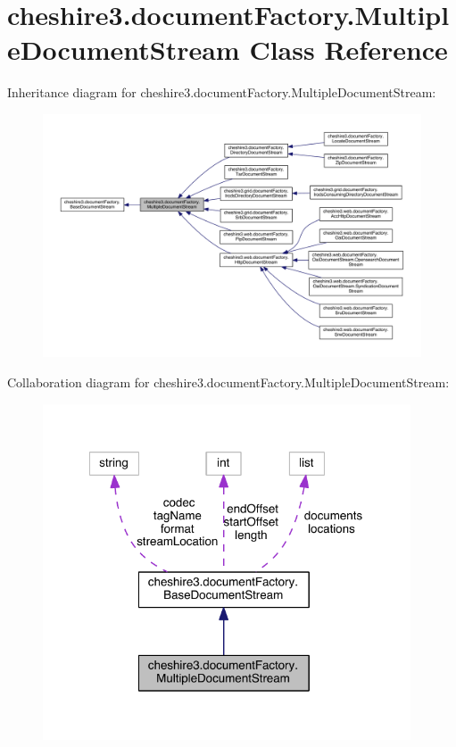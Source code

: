 \hypertarget{classcheshire3_1_1document_factory_1_1_multiple_document_stream}{\section{cheshire3.\-document\-Factory.\-Multiple\-Document\-Stream Class Reference}
\label{classcheshire3_1_1document_factory_1_1_multiple_document_stream}
}


Inheritance diagram for cheshire3.\-document\-Factory.\-Multiple\-Document\-Stream\-:
\nopagebreak
\begin{figure}[H]
\begin{center}
\leavevmode
\includegraphics[width=350pt]{classcheshire3_1_1document_factory_1_1_multiple_document_stream__inherit__graph}
\end{center}
\end{figure}


Collaboration diagram for cheshire3.\-document\-Factory.\-Multiple\-Document\-Stream\-:
\nopagebreak
\begin{figure}[H]
\begin{center}
\leavevmode
\includegraphics[width=309pt]{classcheshire3_1_1document_factory_1_1_multiple_document_stream__coll__graph}
\end{center}
\end{figure}
